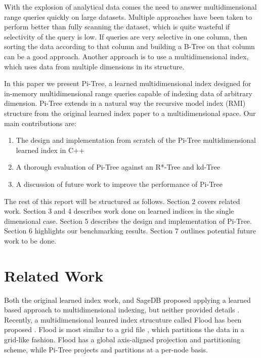 \documentclass[sigconf,10pt]{acmart}
\begin{document}
With the explosion of analytical data comes the need to answer multidimensional range queries
quickly on large datasets. Multiple approaches have been taken to perform better than
fully scanning the dataset, which is quite wasteful if selectivity
of the query is low. If queries are very selective in one column, then sorting the data
according to that column and building a B-Tree on that column can be a good approach. 
Another approach is to use a multidimensional index, which uses data from multiple dimensions
in its structure. 

In this paper we present Pi-Tree, a learned multidimensional index designed for
in-memory multidimensional range queries capable of indexing
data of arbitrary dimension. Pi-Tree extends in a natural way the recursive model index (RMI) structure
from the original learned index paper to a multidimensional space.
Our main contributions are:
\begin{enumerate}
  \item The design and implementation from scratch of the Pi-Tree multidimensional learned index in C++
  \item A thorough evaluation of Pi-Tree against an R*-Tree and kd-Tree 
  \item A discussion of future work to improve the performance of Pi-Tree
\end{enumerate}

The rest of this report will be structured as follows.
Section 2 covers related work. Section 3 and 4 describes
work done on learned indices in the single dimensional case.
Section 5 describes the design and implementation
of Pi-Tree. Section 6 highlights our benchmarking results. Section 7
outlines potential future work to be done.

\section{Related Work}

Both the original learned index work, and SageDB
proposed applying a learned based approach to multidimensional indexing,
but neither provided details \cite{Learned_Index,SageDB}.
Recently, a multidimensional leanred index strucuture called Flood has been proposed  \cite{Flood}. 
Flood is most similar to a grid file
\cite{Grid-File}, which partitions the data in a grid-like fashion.
Flood has a global axis-aligned projection and partitioning scheme,
while Pi-Tree projects and partitions at a per-node basis. 
\end{document}
